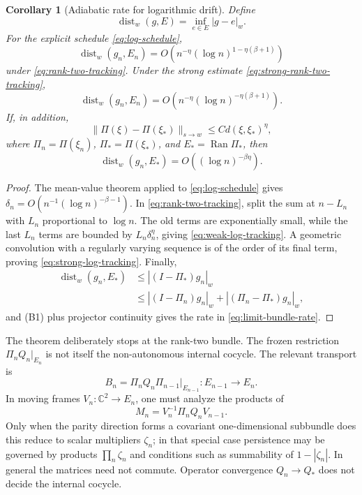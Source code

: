 \documentclass[11pt]{article}
\newtheorem{corollary}[theorem]{Corollary}
\theoremstyle{definition}
\theoremstyle{remark}
\newcommand{\C}{\mathbb C}
\newcommand{\dist}{\operatorname{dist}}
\begin{document}
\begin{corollary}[Adiabatic rate for logarithmic drift]\label{cor:log-tracking}
Define
\[
    \dist_w(g,E)=\inf_{e\in E}|g-e|_w.
\]
For the explicit schedule \eqref{eq:log-schedule},
\begin{equation}\label{eq:weak-log-tracking}
    \dist_w(g_n,E_n)
    =O\!\left(
      n^{-\eta}(\log n)^{1-\eta(\beta+1)}
    \right)
\end{equation}
under \eqref{eq:rank-two-tracking}.  Under the strong estimate \eqref{eq:strong-rank-two-tracking},
\begin{equation}\label{eq:strong-log-tracking}
    \dist_w(g_n,E_n)
    =O\!\left(
      n^{-\eta}(\log n)^{-\eta(\beta+1)}
    \right).
\end{equation}
If, in addition,
\[
    \|\Pi(\xi)-\Pi(\xi_*)\|_{s\to w}
    \le C d(\xi,\xi_*)^\eta,
\]
where $\Pi_n=\Pi(\xi_n)$, $\Pi_*=\Pi(\xi_*)$, and $E_*=\operatorname{Ran}\Pi_*$,
then
\begin{equation}\label{eq:limit-bundle-rate}
    \dist_w(g_n,E_*)
    =O((\log n)^{-\beta\eta}).
\end{equation}
\end{corollary}

\begin{proof}
The mean-value theorem applied to \eqref{eq:log-schedule} gives $\delta_n=O(n^{-1}(\log n)^{-\beta-1})$.  In \eqref{eq:rank-two-tracking}, split the sum at $n-L_n$ with $L_n$ proportional to $\log n$.  The old terms are exponentially small, while the last $L_n$ terms are bounded by $L_n\delta_n^\eta$, giving \eqref{eq:weak-log-tracking}.  A geometric convolution with a regularly varying sequence is of the order of its final term, proving \eqref{eq:strong-log-tracking}.  Finally,
\begin{align*}
    \dist_w(g_n,E_*)
    &\le |(I-\Pi_*)g_n|_w\\
    &\le |(I-\Pi_n)g_n|_w
      +|(\Pi_n-\Pi_*)g_n|_w,
\end{align*}
and (B1) plus projector continuity gives the rate in \eqref{eq:limit-bundle-rate}.
\end{proof}

The theorem deliberately stops at the rank-two bundle.  The frozen restriction $\Pi_nQ_n|_{E_n}$ is not itself the non-autonomous internal cocycle.  The relevant transport is
\begin{equation}\label{eq:internal-bundle-cocycle}
    B_n=\Pi_nQ_n\Pi_{n-1}|_{E_{n-1}}
    :E_{n-1}\longrightarrow E_n.
\end{equation}
In moving frames $V_n:\C^2\to E_n$, one must analyze the products of
\[
    M_n=V_n^{-1}\Pi_nQ_nV_{n-1}.
\]
Only when the parity direction forms a covariant one-dimensional subbundle does this reduce to scalar multipliers $\zeta_n$; in that special case persistence may be governed by products $\prod_n\zeta_n$ and conditions such as summability of $1-|\zeta_n|$.  In general the matrices need not commute.  Operator convergence $Q_n\to Q_*$ does not decide the internal cocycle.
\end{document}
